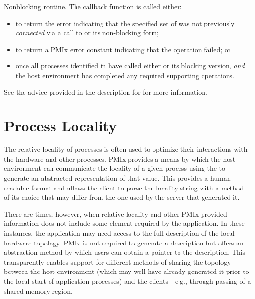 
\optattrend

\descr

Nonblocking  routine. The callback function is called either:

\begin{itemize}
    \item to return the  error indicating that the specified set of  was not previously \textit{connected} via a call to  or its non-blocking form;

    \item to return a \ac{PMIx} error constant indicating that the operation failed; or

    \item once all processes identified in  have called either  or its blocking version, \textit{and} the host environment has completed any required supporting operations.
\end{itemize}

See the advice provided in the description for  for more information.


\section{Process Locality}
\label{chap:api_proc_mgmt:locality}

The relative locality of processes is often used to optimize their interactions with the hardware and other processes. \ac{PMIx} provides a means by which the host environment can communicate the locality of a given process using the  to generate an abstracted representation of that value. This provides a human-readable format and allows the client to parse the locality string with a method of its choice that may differ from the one used by the server that generated it.

There are times, however, when relative locality and other \ac{PMIx}-provided
information does not include some element required by the application. In these
instances, the application may need access to the full description of the
local hardware topology.
\ac{PMIx} is not required to generate a description but offers an abstraction
method by which users can obtain a pointer to
the description. This transparently enables support for different methods of
sharing the topology between the host environment (which may well have already
generated it prior to the local start of application processes) and the clients -
e.g., through passing of a shared memory region.

